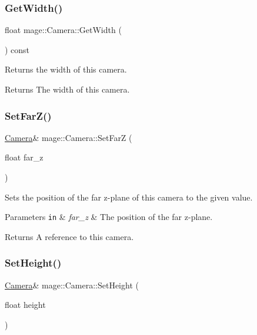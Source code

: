 \hypertarget{classmage_1_1_camera_a2285655605035118861297b2449a3443}{}\label{classmage_1_1_camera_a2285655605035118861297b2449a3443} 
\subsubsection{\texorpdfstring{Get\+Width()}{GetWidth()}}
{\footnotesize\ttfamily float mage\+::\+Camera\+::\+Get\+Width (\begin{DoxyParamCaption}{ }\end{DoxyParamCaption}) const}

Returns the width of this camera.

\begin{DoxyReturn}{Returns}
The width of this camera. 
\end{DoxyReturn}
\hypertarget{classmage_1_1_camera_acd1ab15368f052b846f72b92a52a94c5}{}\label{classmage_1_1_camera_acd1ab15368f052b846f72b92a52a94c5} 
\subsubsection{\texorpdfstring{Set\+Far\+Z()}{SetFarZ()}}
{\footnotesize\ttfamily \hyperlink{classmage_1_1_camera}{Camera}\& mage\+::\+Camera\+::\+Set\+FarZ (\begin{DoxyParamCaption}\item[{float}]{far\+\_\+z }\end{DoxyParamCaption})}

Sets the position of the far z-\/plane of this camera to the given value.


\begin{DoxyParams}[1]{Parameters}
\mbox{\tt in}  & {\em far\+\_\+z} & The position of the far z-\/plane. \\
\hline
\end{DoxyParams}
\begin{DoxyReturn}{Returns}
A reference to this camera. 
\end{DoxyReturn}
\hypertarget{classmage_1_1_camera_a83ab1d3345b3fc318608c016b6b523d9}{}\label{classmage_1_1_camera_a83ab1d3345b3fc318608c016b6b523d9} 
\subsubsection{\texorpdfstring{Set\+Height()}{SetHeight()}}
{\footnotesize\ttfamily \hyperlink{classmage_1_1_camera}{Camera}\& mage\+::\+Camera\+::\+Set\+Height (\begin{DoxyParamCaption}\item[{float}]{height }\end{DoxyParamCaption})}

